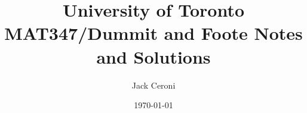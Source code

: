 \documentclass[superscriptaddress,pra,nofootinbib,notitlepage, floatfix]{revtex4-1}
\begin{document}
\title{University of Toronto MAT347/Dummit and Foote Notes and Solutions}

\author{Jack Ceroni}

\date{\today}

\maketitle
\end{document}
